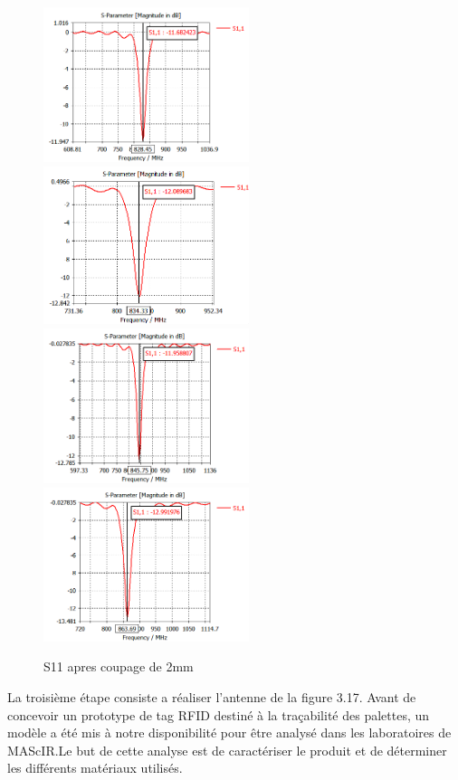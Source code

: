 \documentclass[11pt, a4paper, twoside]{book}
\begin{document}
\begin{figure}[H]
\centering
\includegraphics[width=6cm]{11}
\includegraphics[width=6cm]{22}\\
\includegraphics[width=6cm]{33}
\includegraphics[width=6cm]{44}
\caption{S11 apres coupage de 2mm }
\end{figure}

La troisième étape  consiste a réaliser l'antenne de la figure 3.17. 
Avant de concevoir un prototype de tag RFID destiné à la traçabilité des palettes, un modèle a été mis à notre disponibilité pour être analysé dans les laboratoires de MAScIR.Le but de cette analyse est de caractériser le produit et de déterminer les différents matériaux utilisés.\\
\end{document}
